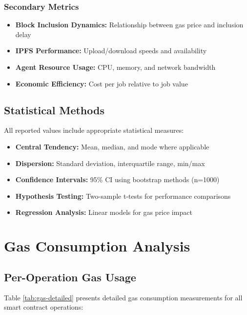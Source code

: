 \subsubsection{Secondary Metrics}
\begin{itemize}
    \item \textbf{Block Inclusion Dynamics:} Relationship between gas price and inclusion delay
    \item \textbf{IPFS Performance:} Upload/download speeds and availability
    \item \textbf{Agent Resource Usage:} CPU, memory, and network bandwidth
    \item \textbf{Economic Efficiency:} Cost per job relative to job value
\end{itemize}

\subsection{Statistical Methods}

All reported values include appropriate statistical measures:
\begin{itemize}
    \item \textbf{Central Tendency:} Mean, median, and mode where applicable
    \item \textbf{Dispersion:} Standard deviation, interquartile range, min/max
    \item \textbf{Confidence Intervals:} 95\% CI using bootstrap methods (n=1000)
    \item \textbf{Hypothesis Testing:} Two-sample t-tests for performance comparisons
    \item \textbf{Regression Analysis:} Linear models for gas price impact
\end{itemize}

\section{Gas Consumption Analysis}

\subsection{Per-Operation Gas Usage}

Table \ref{tab:gas-detailed} presents detailed gas consumption measurements for all smart contract operations:

